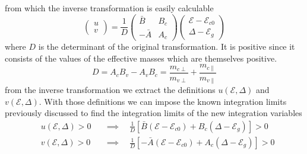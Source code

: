 from which the inverse transformation is easily calculable
\begin{equation}
\begin{pmatrix} u \\ v \end{pmatrix} = \frac{1}{D}\begin{pmatrix}
\bar{B} & B_{c} \\ -\bar{A} & A_{c}\end{pmatrix}\begin{pmatrix} \mathcal{E} - \mathcal{E}_{c0} \\ \Delta - \mathcal{E}_g \end{pmatrix}
\label{eq:quadratic_interband_inverse_transform}
\end{equation}
where $D$ is the determinant of the original transformation. It is positive since it consists of the values of the effective masses which are themselves positive.
\begin{equation}
D = A_{c}B_{v}-A_{v}B_{c} = \frac{m_{c \perp}}{m_{v \perp}} + \frac{m_{c \parallel}}{m_{v \parallel}}
\label{eq:quadratic_interband_determinant}
\end{equation}
from the inverse transformation we extract the definitions $u(\mathcal{E},\Delta)$ and $v(\mathcal{E},\Delta)$. With those definitions we can impose the known integration limits previously discussed to find the integration limits of the new integration variables
\begin{align}
&u(\mathcal{E}, \Delta)>0  &&\implies  \quad \frac{1}{D} \left[ \bar{B}(\mathcal{E} - \mathcal{E}_{c0}) + B_c(\Delta - \mathcal{E}_g) \right] >0
\\  
&v(\mathcal{E}, \Delta)>0 &&\implies  \quad \frac{1}{D} \left[ -\bar{A}(\mathcal{E} - \mathcal{E}_{c0}) + A_c(\Delta - \mathcal{E}_g) \right] >0
\label{eq:quadratic_interband_integration_limits}
\end{align}

